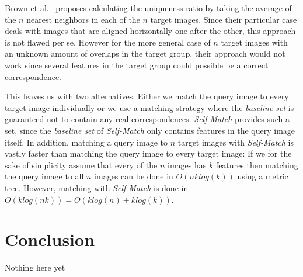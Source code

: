 \documentclass[journal]{IEEEtran}
\begin{document}
Brown et al.\ \cite{brown2005multi} proposes calculating the uniqueness 
ratio by taking the average of the $n$ nearest neighbors in each of the 
$n$ target images. Since their particular case deals with images that 
are aligned horizontally one after the other, this approach is not 
flawed per se. However for the more general case of $n$ target images 
with an unknown amount of overlaps in the target group, their approach 
would not work since several features in the target group could possible 
be a correct correspondence. 

This leaves us with two alternatives. Either we match the query image to 
every target image individually or we use a matching strategy where the 
\emph{baseline set} is guaranteed not to contain any real 
correspondences. \emph{Self-Match} provides such a set, since the 
\emph{baseline set} of \emph{Self-Match} only contains features in the 
query image itself. In addition, matching a query image to $n$ target 
images with \emph{Self-Match} is vastly faster than matching the query 
image to every target image: If we for the sake of simplicity assume 
that every of the $n$ images has $k$ features then matching the query 
image to all $n$ images can be done in $O(nklog(k))$ using a metric 
tree. However, matching with \emph{Self-Match} is done in $O(klog(nk)) =
O(klog(n) + klog(k))$.

\section{Conclusion}
\label{S:Summary}

Nothing here yet








\end{document}
